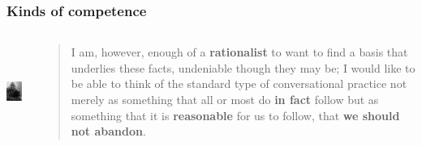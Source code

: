 \documentclass[compress]{beamer}
\begin{document}
\begin{frame}
\frametitle{Kinds of competence}
\begin{columns}[T]  
   \begin{column}{.2\textwidth}
	  \vspace{20pt}
	  \includegraphics[height=1.2in]{grice.jpg}   
   \end{column}
   \begin{column}{.75\textwidth}
      \begin{block}{}
      \begin{quote}
	   I am, however, enough of a \textbf{rationalist} to want to find a basis that underlies these facts, undeniable though they may be; I would like to be able to think of the standard type of conversational practice not merely as something that all or most do \textbf{in fact} follow but as something that it is \textbf{reasonable} for us to follow, that \textbf{we should not abandon}. 
      \end{quote}           
      \end{block}
    \end{column}
  \end{columns}
\vfill \hfill \citep{grice1975}
\end{frame}
\end{document}
